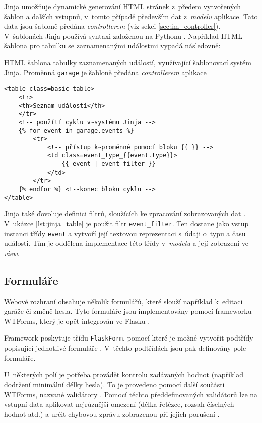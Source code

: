 Jinja umožňuje dynamické generování HTML stránek z~předem vytvořených šablon a dalších vstupnů, v~tomto případě především dat z~\textit{modelu} aplikace. Tato data jsou šabloně předána \textit{controllerem} (viz sekci \ref{sec:im_controller}). V~šablonách Jinja používá syntaxi založenou na Pythonu \cite{jinja}. Například HTML šablona pro tabulku se zaznamenanými událostmi vypadá následovně:

\begin{listing}[htbp]
\caption{\label{lst:jinja_table} HTML šablona tabulky zaznamenaných událostí, využívající šablonovací systém Jinja. Proměnná \texttt{garage} je šabloně předána \textit{controllerem} aplikace}
\begin{verbatim}
<table class=basic_table>
    <tr>
    <th>Seznam událostí</th>
    </tr>
    <!-- použítí cyklu v~systému Jinja -->
    {% for event in garage.events %}
        <tr>
            <!-- přístup k~proměnné pomocí bloku {{ }} -->
            <td class=event_type_{{event.type}}>
                {{ event | event_filter }}
            </td>
        </tr>
    {% endfor %} <!--konec bloku cyklu -->
</table>
\end{verbatim}
\end{listing}

Jinja také ďovoluje definici filtrů, sloužících ke zpracování zobrazovaných dat \cite{jinja}. V~ukázce \ref{lst:jinja_table} je použit filtr \texttt{event\_filter}. Ten dostane jako vstup instanci třídy \texttt{event} a vytvoří její textovou reprezentaci s~údaji o~typu a času události. Tím je oddělena implementace této třídy v~\textit{modelu} a její zobrazení ve \textit{view}.

\subsection{Formuláře}
\label{sec:im_forms}

Webové rozhraní obsahuje několik formulářů, které slouží například k~editaci garáže či změně hesla. Tyto formuláře jsou implementovány pomocí frameworku WTForms, který je opět integrován ve Flasku \cite{flask_wtf}.

Framework poskytuje třídu \texttt{FlaskForm}, pomocí které je možné vytvořit podtřídy popisující jednotlivé formuláře \cite{flask_wtf}. V~těchto podtřídách jsou pak definovány pole formuláře.

U~některých polí je potřeba provádět kontrolu zadávaných hodnot (například dodržení minimální délky hesla). To je provedeno pomocí další součásti WTForms, nazvané validátory \cite{flask_wtf}. Pomocí těchto předdefinovaných validátorů lze na vstupní data aplikovat nejrůznější omezení (délka řetězce, rozsah číselných hodnot atd.) a určit chybovou zprávu zobrazenou při jejich porušení \cite{flask_wtf}.

